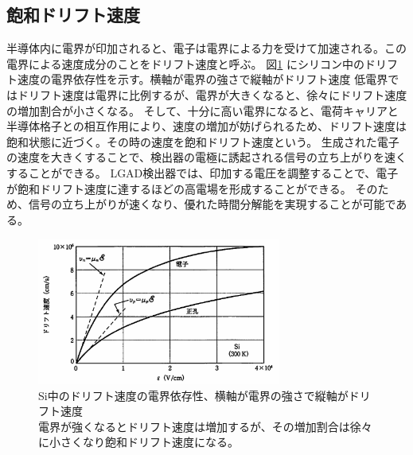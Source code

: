 \subsection{飽和ドリフト速度}
半導体内に電界が印加されると、電子は電界による力を受けて加速される。この電界による速度成分のことをドリフト速度と呼ぶ。
図\ref{fg:drift} にシリコン中のドリフト速度の電界依存性を示す。横軸が電界の強さで縦軸がドリフト速度
低電界ではドリフト速度は電界に比例するが、電界が大きくなると、徐々にドリフト速度の増加割合が小さくなる。
そして、十分に高い電界になると、電荷キャリアと半導体格子との相互作用により、速度の増加が妨げられるため、ドリフト速度は飽和状態に近づく。その時の速度を飽和ドリフト速度という。
生成された電子の速度を大きくすることで、検出器の電極に誘起される信号の立ち上がりを速くすることができる。
LGAD検出器では、印加する電圧を調整することで、電子が飽和ドリフト速度に達するほどの高電場を形成することができる。
そのため、信号の立ち上がりが速くなり、優れた時間分解能を実現することが可能である。

\begin{figure}[h]
    \centering
    \includegraphics[width=8cm]{fig/ch3/drift.jpg}
    \caption[Si中のドリフト速度の電界依存性\cite{sze2012semiconductor}]{Si中のドリフト速度の電界依存性\cite{sze2012semiconductor}、横軸が電界の強さで縦軸がドリフト速度\\電界が強くなるとドリフト速度は増加するが、その増加割合は徐々に小さくなり飽和ドリフト速度になる。}
    \label{fg:drift}
\end{figure}

